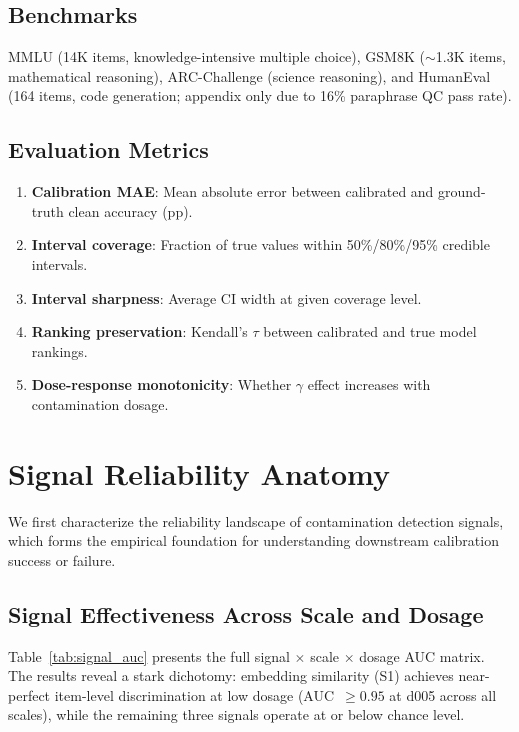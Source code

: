 \documentclass[11pt]{article}
\begin{document}
\subsection{Benchmarks}
MMLU (14K items, knowledge-intensive multiple choice), GSM8K ($\sim$1.3K items, mathematical reasoning), ARC-Challenge (science reasoning), and HumanEval (164 items, code generation; appendix only due to 16\% paraphrase QC pass rate).

\subsection{Evaluation Metrics}
\begin{enumerate}
\item \textbf{Calibration MAE}: Mean absolute error between calibrated and ground-truth clean accuracy (pp).
\item \textbf{Interval coverage}: Fraction of true values within 50\%/80\%/95\% credible intervals.
\item \textbf{Interval sharpness}: Average CI width at given coverage level.
\item \textbf{Ranking preservation}: Kendall's $\tau$ between calibrated and true model rankings.
\item \textbf{Dose-response monotonicity}: Whether $\gamma$ effect increases with contamination dosage.
\end{enumerate}


\section{Signal Reliability Anatomy}
\label{sec:signals}

We first characterize the reliability landscape of contamination detection signals, which forms the empirical foundation for understanding downstream calibration success or failure.

\subsection{Signal Effectiveness Across Scale and Dosage}
\label{sec:signal_matrix}

Table~\ref{tab:signal_auc} presents the full signal $\times$ scale $\times$ dosage AUC matrix.
The results reveal a stark dichotomy: embedding similarity (S1) achieves near-perfect item-level discrimination at low dosage (AUC~$\geq 0.95$ at d005 across all scales), while the remaining three signals operate at or below chance level.
\end{document}
